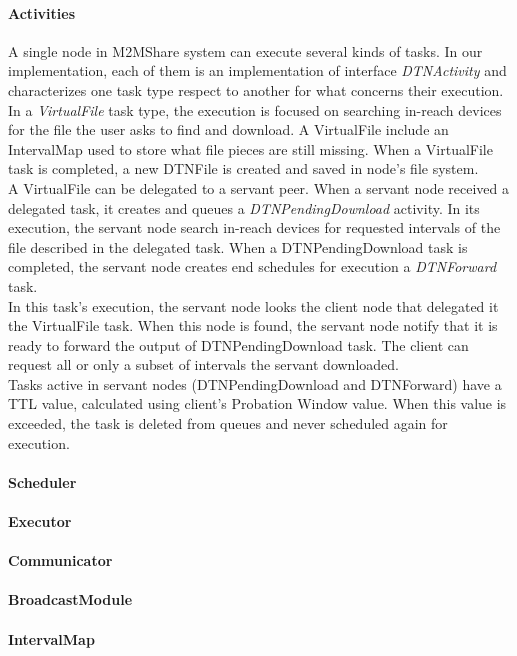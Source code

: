 \paragraph{Activities}
A single node in M2MShare system can execute several kinds of tasks. In our implementation, each of them is an implementation of interface \textit{DTNActivity} and characterizes one task type respect to another for what concerns their execution. 
\\
In a \textit{VirtualFile} task type, the execution is focused on searching in-reach devices for the file the user asks to find and download. A VirtualFile include an IntervalMap used to store what file pieces are still missing. When a VirtualFile task is completed, a new DTNFile is created and saved in node's file system. 
\\
A VirtualFile can be delegated to a servant peer. When a servant node received a delegated task, it creates and queues a \textit{DTNPendingDownload} activity. In its execution, the servant node search in-reach devices for requested intervals of the file described in the delegated task. When a DTNPendingDownload task is completed, the servant node creates end schedules for execution a \textit{DTNForward} task.
\\
In this task's execution, the servant node looks the client node that delegated it the VirtualFile task. When this node is found, the servant node notify that it is ready to forward the output of DTNPendingDownload task. The client can request all or only a subset of intervals the servant downloaded.
\\

Tasks active in servant nodes (DTNPendingDownload and DTNForward) have a TTL value, calculated using client's Probation Window value. When this value is exceeded, the task is deleted from queues and never scheduled again for execution.
 
\paragraph{Scheduler}
\label{schedulerImplementazione}
\paragraph{Executor}
\paragraph{Communicator}

\paragraph{BroadcastModule}

\paragraph{IntervalMap}
 

